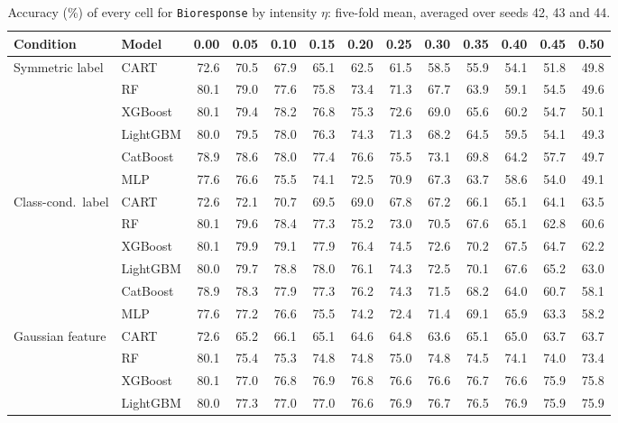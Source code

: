 \begin{table}[p]
\centering
\tiny
\setlength{\tabcolsep}{2.6pt}
\caption{Accuracy (\%) of every cell for \texttt{Bioresponse} by intensity $\eta$: five-fold mean, averaged over seeds 42, 43 and 44.}
\label{tab:grid_Bioresponse}
\begin{tabular}{@{}llrrrrrrrrrrr@{}}
\toprule
Condition & Model & 0.00 & 0.05 & 0.10 & 0.15 & 0.20 & 0.25 & 0.30 & 0.35 & 0.40 & 0.45 & 0.50 \\
\midrule
Symmetric label & CART & 72.6 & 70.5 & 67.9 & 65.1 & 62.5 & 61.5 & 58.5 & 55.9 & 54.1 & 51.8 & 49.8 \\
 & RF & 80.1 & 79.0 & 77.6 & 75.8 & 73.4 & 71.3 & 67.7 & 63.9 & 59.1 & 54.5 & 49.6 \\
 & XGBoost & 80.1 & 79.4 & 78.2 & 76.8 & 75.3 & 72.6 & 69.0 & 65.6 & 60.2 & 54.7 & 50.1 \\
 & LightGBM & 80.0 & 79.5 & 78.0 & 76.3 & 74.3 & 71.3 & 68.2 & 64.5 & 59.5 & 54.1 & 49.3 \\
 & CatBoost & 78.9 & 78.6 & 78.0 & 77.4 & 76.6 & 75.5 & 73.1 & 69.8 & 64.2 & 57.7 & 49.7 \\
 & MLP & 77.6 & 76.6 & 75.5 & 74.1 & 72.5 & 70.9 & 67.3 & 63.7 & 58.6 & 54.0 & 49.1 \\
\midrule
Class-cond.\ label & CART & 72.6 & 72.1 & 70.7 & 69.5 & 69.0 & 67.8 & 67.2 & 66.1 & 65.1 & 64.1 & 63.5 \\
 & RF & 80.1 & 79.6 & 78.4 & 77.3 & 75.2 & 73.0 & 70.5 & 67.6 & 65.1 & 62.8 & 60.6 \\
 & XGBoost & 80.1 & 79.9 & 79.1 & 77.9 & 76.4 & 74.5 & 72.6 & 70.2 & 67.5 & 64.7 & 62.2 \\
 & LightGBM & 80.0 & 79.7 & 78.8 & 78.0 & 76.1 & 74.3 & 72.5 & 70.1 & 67.6 & 65.2 & 63.0 \\
 & CatBoost & 78.9 & 78.3 & 77.9 & 77.3 & 76.2 & 74.3 & 71.5 & 68.2 & 64.0 & 60.7 & 58.1 \\
 & MLP & 77.6 & 77.2 & 76.6 & 75.5 & 74.2 & 72.4 & 71.4 & 69.1 & 65.9 & 63.3 & 58.2 \\
\midrule
Gaussian feature & CART & 72.6 & 65.2 & 66.1 & 65.1 & 64.6 & 64.8 & 63.6 & 65.1 & 65.0 & 63.7 & 63.7 \\
 & RF & 80.1 & 75.4 & 75.3 & 74.8 & 74.8 & 75.0 & 74.8 & 74.5 & 74.1 & 74.0 & 73.4 \\
 & XGBoost & 80.1 & 77.0 & 76.8 & 76.9 & 76.8 & 76.6 & 76.6 & 76.7 & 76.6 & 75.9 & 75.8 \\
 & LightGBM & 80.0 & 77.3 & 77.0 & 77.0 & 76.6 & 76.9 & 76.7 & 76.5 & 76.9 & 75.9 & 75.9 \\

\end{tabular}
\end{table}
